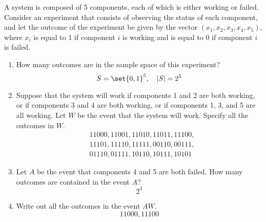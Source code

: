 \item A system is composed of 5 components, each of which is either working or failed. Consider an experiment that consists of observing the status of each component, and let the outcome of the experiment be given by the vector $(x_1, x_2, x_3, x_4, x_5)$, where $x_i$ is equal to 1 if component $i$ is working and is equal to 0 if component $i$ is failed.
\begin{enumerate}
    \item How many outcomes are in the sample space of this experiment?
    \[ S = \set{0,1}^5,\quad |S| = 2^5 \]
    \item Suppose that the system will work if components 1 and 2 are both working, or if components 3 and 4 are both working, or if components 1, 3, and 5 are all working. Let $W$ be the event that the system will work. Specify all the outcomes in $W$.
    \begin{align*}
        &11000,11001,11010,11011,11100,\\
        &11101,11110,11111,00110,00111,\\
        &01110,01111,10110,10111,10101
    \end{align*}
    \item Let $A$ be the event that components 4 and 5 are both failed. How many outcomes are contained in the event $A$?
    \[ 2^3 \]
    \item Write out all the outcomes in the event $AW$.
    \[
        11000,11100
    \]
\end{enumerate}